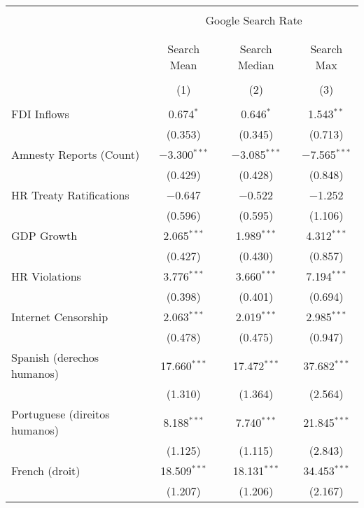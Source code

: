 
\begin{table}[!htbp] \centering 
  \caption{} 
  \label{} 
\begin{tabular}{@{\extracolsep{5pt}}lccc} 
\\[-1.8ex]\hline 
\hline \\[-1.8ex] 
 & \multicolumn{3}{c}{Google Search Rate} \\ 
\cline{2-4} 
\\[-1.8ex] & \multicolumn{3}{c}{ } \\ 
 & Search Mean & Search Median & Search Max \\ 
\\[-1.8ex] & (1) & (2) & (3)\\ 
\hline \\[-1.8ex] 
 FDI Inflows & 0.674$^{*}$ & 0.646$^{*}$ & 1.543$^{**}$ \\ 
  & (0.353) & (0.345) & (0.713) \\ 
  Amnesty Reports (Count) & $-$3.300$^{***}$ & $-$3.085$^{***}$ & $-$7.565$^{***}$ \\ 
  & (0.429) & (0.428) & (0.848) \\ 
  HR Treaty Ratifications & $-$0.647 & $-$0.522 & $-$1.252 \\ 
  & (0.596) & (0.595) & (1.106) \\ 
  GDP Growth & 2.065$^{***}$ & 1.989$^{***}$ & 4.312$^{***}$ \\ 
  & (0.427) & (0.430) & (0.857) \\ 
  HR Violations & 3.776$^{***}$ & 3.660$^{***}$ & 7.194$^{***}$ \\ 
  & (0.398) & (0.401) & (0.694) \\ 
  Internet Censorship & 2.063$^{***}$ & 2.019$^{***}$ & 2.985$^{***}$ \\ 
  & (0.478) & (0.475) & (0.947) \\ 
  Spanish (derechos humanos) & 17.660$^{***}$ & 17.472$^{***}$ & 37.682$^{***}$ \\ 
  & (1.310) & (1.364) & (2.564) \\ 
  Portuguese (direitos humanos) & 8.188$^{***}$ & 7.740$^{***}$ & 21.845$^{***}$ \\ 
  & (1.125) & (1.115) & (2.843) \\ 
  French (droit) & 18.509$^{***}$ & 18.131$^{***}$ & 34.453$^{***}$ \\ 
  & (1.207) & (1.206) & (2.167) \\ 

\end{tabular}
\end{table}
